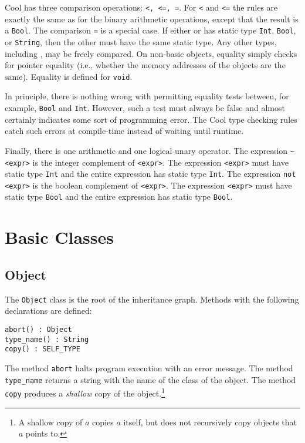 Cool has three comparison operations: {\tt <, <=, =}.
For {\tt <} and {\tt <=} the rules are exactly the same as
for the binary arithmetic operations, except that the result
is a {\tt Bool}.  The comparison {\tt =} is a special case.
If either {\tt <expr1>} or {\tt <expr2>} has static type {\tt Int},
{\tt Bool}, or {\tt String}, then the other must have the same static type.
Any other types, including \styp, may be freely compared. 
On non-basic objects, equality simply checks for pointer equality (i.e.,
whether the memory addresses of the objects are the same).  Equality
is defined for {\tt void}.

In principle, there is nothing wrong with permitting equality
tests between, for example, {\tt Bool} and {\tt Int}.  However, such a test
must always be false and almost certainly indicates some sort of
programming error.  The Cool type checking rules catch such errors
at compile-time instead of waiting until runtime.

Finally, there is one arithmetic and one logical unary operator.
The expression {\tt \~{ }<expr>} is the integer complement of {\tt <expr>}.
The expression {\tt <expr>} must have static type {\tt Int} and the entire
expression has static type {\tt Int}.
The expression {\tt not <expr>} is the boolean complement of {\tt <expr>}.
The expression {\tt <expr>} must have static type {\tt Bool} and the entire
expression has static type {\tt Bool}.

\section{Basic Classes}
\label{sec-basic}

\subsection{Object}
The {\tt Object} class is the root of the inheritance graph.
Methods with the following declarations are defined:
\begin{verbatim}
abort() : Object
type_name() : String
copy() : SELF_TYPE
\end{verbatim}
The method {\tt abort} halts program execution with an error message.
The method {\tt type\_name} returns a string with the name of the class
of the object.
The method {\tt copy} produces a {\em shallow} copy of the object.\footnote{A shallow copy of $a$ copies $a$ itself, but does not recursively
copy objects that $a$ points to.}

